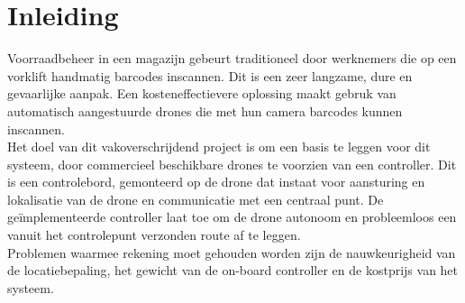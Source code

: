 \chapter*{Inleiding}
Voorraadbeheer in een magazijn gebeurt traditioneel door werknemers die op een vorklift handmatig barcodes inscannen.
Dit is een zeer langzame, dure en gevaarlijke aanpak.
Een kosteneffectievere oplossing maakt gebruk van automatisch aangestuurde drones die met hun camera barcodes kunnen inscannen.\\

Het doel van dit vakoverschrijdend project is om een basis te leggen voor dit systeem, door commercieel beschikbare drones te voorzien van een controller.
Dit is een controlebord, gemonteerd op de drone dat instaat voor aansturing en lokalisatie van de drone en communicatie met een centraal punt. De ge\"implementeerde controller laat toe om de drone autonoom en probleemloos een vanuit het controlepunt verzonden route af te leggen.\\

Problemen waarmee rekening moet gehouden worden zijn de nauwkeurigheid van de locatiebepaling, het gewicht van de on-board controller en de kostprijs van het systeem.